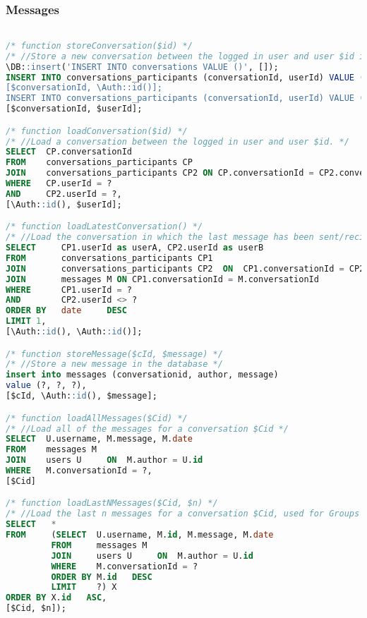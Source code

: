 \subsubsection{Messages}
\begin{lstlisting}[language=sql]

/* function storeConversation($id) */
/* //Store a new conversation between the logged in user and user $id in the database. */
\DB::insert('INSERT INTO conversations VALUE ()', []);
INSERT INTO conversations_participants (conversationId, userId) VALUE (?, ?)',
[$conversationId, \Auth::id()];
INSERT INTO conversations_participants (conversationId, userId) VALUE (?, ?)',
[$conversationId, $userId];

/* function loadConversation($id) */
/* //Load a conversation between the logged in user and user $id. */
SELECT  CP.conversationId
FROM    conversations_participants CP
JOIN    conversations_participants CP2 ON CP.conversationId = CP2.conversationId
WHERE   CP.userId = ?
AND     CP2.userId = ?,
[\Auth::id(), $userId];

/* function loadLatestConversation() */
/* //Load the conversation in which the last message has been sent/recieved */
SELECT     CP1.userId as userA, CP2.userId as userB
FROM       conversations_participants CP1
JOIN       conversations_participants CP2  ON  CP1.conversationId = CP2.conversationId
JOIN       messages M ON CP1.conversationId = M.conversationId
WHERE      CP1.userId = ?
AND        CP2.userId <> ?
ORDER BY   date     DESC
LIMIT 1,
[\Auth::id(), \Auth::id()];

/* function storeMessage($cId, $message) */
/* //Store a new message in the database */
insert into messages (conversationid, author, message)
value (?, ?, ?),
[$cId, \Auth::id(), $message];

/* function loadAllMessages($Cid) */
/* //Load all of the messages for a conversation $Cid */
SELECT  U.username, M.message, M.date
FROM    messages M
JOIN    users U     ON  M.author = U.id
WHERE   M.conversationId = ?,
[$Cid]

/* function loadLastNMessages($Cid, $n) */
/* //Load the last n messages for a conversation $Cid, used for Groups' chats */
SELECT   *
FROM     (SELECT  U.username, M.id, M.message, M.date
         FROM     messages M
         JOIN     users U     ON  M.author = U.id
         WHERE    M.conversationId = ?
         ORDER BY M.id   DESC
         LIMIT    ?) X
ORDER BY X.id   ASC,
[$Cid, $n]);


\end{lstlisting}
